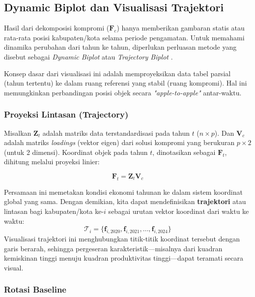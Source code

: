 \documentclass[a4paper]{article}
\theoremstyle{definition} %
\begin{document}
\subsection{Dynamic Biplot dan Visualisasi Trajektori}

Hasil dari dekomposisi kompromi ($\mathbf{F}_c$) hanya memberikan gambaran statis atau rata-rata posisi kabupaten/kota selama periode pengamatan. Untuk memahami dinamika perubahan dari tahun ke tahun, diperlukan perluasan metode yang disebut sebagai \textit{Dynamic Biplot} atau \textit{Trajectory Biplot} \citep{egido2015}.

Konsep dasar dari visualisasi ini adalah memproyeksikan data tabel parsial (tahun tertentu) ke dalam ruang referensi yang stabil (ruang kompromi). Hal ini memungkinkan perbandingan posisi objek secara \textit{"apple-to-apple"} antar-waktu.

\subsubsection{Proyeksi Lintasan (Trajectory)}

Misalkan $\mathbf{Z}_t$ adalah matriks data terstandardisasi pada tahun $t$ ($n \times p$). Dan $\mathbf{V}_c$ adalah matriks \textit{loadings} (vektor eigen) dari solusi kompromi yang berukuran $p \times 2$ (untuk 2 dimensi). Koordinat objek pada tahun $t$, dinotasikan sebagai $\mathbf{F}_t$, dihitung melalui proyeksi linier:

\begin{equation}
	\mathbf{F}_t = \mathbf{Z}_t \mathbf{V}_c
\end{equation}

Persamaan ini memetakan kondisi ekonomi tahunan ke dalam sistem koordinat global yang sama. Dengan demikian, kita dapat mendefinisikan \textbf{trajektori} atau lintasan bagi kabupaten/kota ke-$i$ sebagai urutan vektor koordinat dari waktu ke waktu:
\begin{equation}
	\mathcal{T}_i = \{ \mathbf{f}_{i,2020}, \mathbf{f}_{i,2021}, \dots, \mathbf{f}_{i,2024} \}
\end{equation}
Visualisasi trajektori ini menghubungkan titik-titik koordinat tersebut dengan garis berarah, sehingga pergeseran karakteristik—misalnya dari kuadran kemiskinan tinggi menuju kuadran produktivitas tinggi—dapat teramati secara visual.

\subsubsection{Rotasi Baseline}
\end{document}

